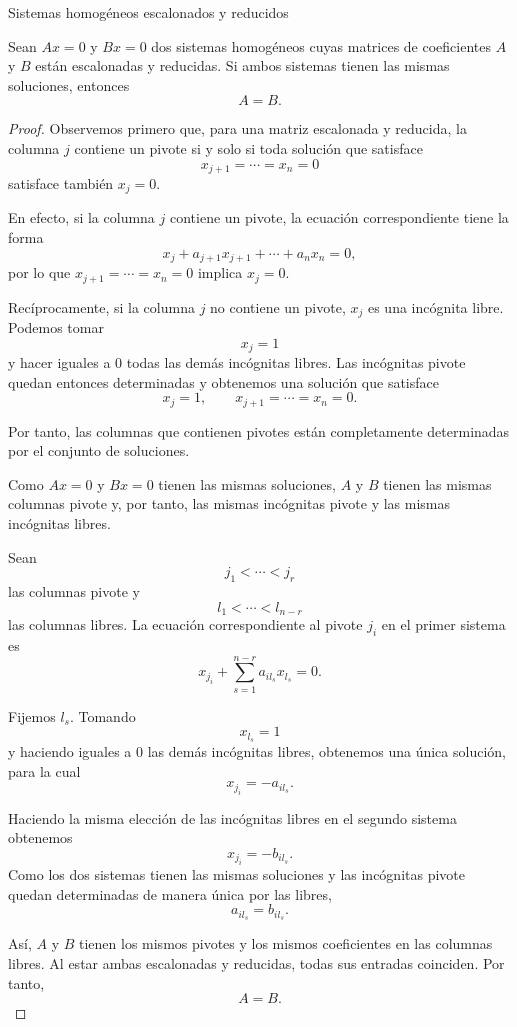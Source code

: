 \begin{frame}[allowframebreaks, t]
{Sistemas homogéneos escalonados y reducidos}

\begin{proposition}
Sean \(Ax=0\) y \(Bx=0\) dos sistemas homogéneos cuyas matrices de
coeficientes \(A\) y \(B\) están escalonadas y reducidas.
Si ambos sistemas tienen las mismas soluciones, entonces
\[
A=B.
\]
\end{proposition}

\begin{proof}
Observemos primero que, para una matriz escalonada y reducida, la
columna \(j\) contiene un pivote si y solo si toda solución que
satisface
\[
x_{j+1}=\cdots=x_n=0
\]
satisface también \(x_j=0\).

En efecto, si la columna \(j\) contiene un pivote, la ecuación
correspondiente tiene la forma
\[
x_j+a_{j+1}x_{j+1}+\cdots+a_nx_n=0,
\]
por lo que \(x_{j+1}=\cdots=x_n=0\) implica \(x_j=0\).

Recíprocamente, si la columna \(j\) no contiene un pivote, \(x_j\)
es una incógnita libre. Podemos tomar
\[
x_j=1
\]
y hacer iguales a \(0\) todas las demás incógnitas libres.
Las incógnitas pivote quedan entonces determinadas y obtenemos una
solución que satisface
\[
x_j=1,
\qquad
x_{j+1}=\cdots=x_n=0.
\]

Por tanto, las columnas que contienen pivotes están completamente
determinadas por el conjunto de soluciones.

Como \(Ax=0\) y \(Bx=0\) tienen las mismas soluciones, \(A\) y \(B\)
tienen las mismas columnas pivote y, por tanto, las mismas incógnitas
pivote y las mismas incógnitas libres.

Sean
\[
j_1<\cdots<j_r
\]
las columnas pivote y
\[
l_1<\cdots<l_{n-r}
\]
las columnas libres. La ecuación correspondiente al pivote \(j_i\)
en el primer sistema es
\[
x_{j_i}
+\sum_{s=1}^{n-r}a_{i l_s}x_{l_s}=0.
\]

Fijemos \(l_s\). Tomando
\[
x_{l_s}=1
\]
y haciendo iguales a \(0\) las demás incógnitas libres, obtenemos
una única solución, para la cual
\[
x_{j_i}=-a_{i l_s}.
\]

Haciendo la misma elección de las incógnitas libres en el segundo
sistema obtenemos
\[
x_{j_i}=-b_{i l_s}.
\]
Como los dos sistemas tienen las mismas soluciones y las incógnitas
pivote quedan determinadas de manera única por las libres,
\[
a_{i l_s}=b_{i l_s}.
\]

Así, \(A\) y \(B\) tienen los mismos pivotes y los mismos coeficientes
en las columnas libres. Al estar ambas escalonadas y reducidas,
todas sus entradas coinciden. Por tanto,
\[
A=B.
\]
\end{proof}

\end{frame}

